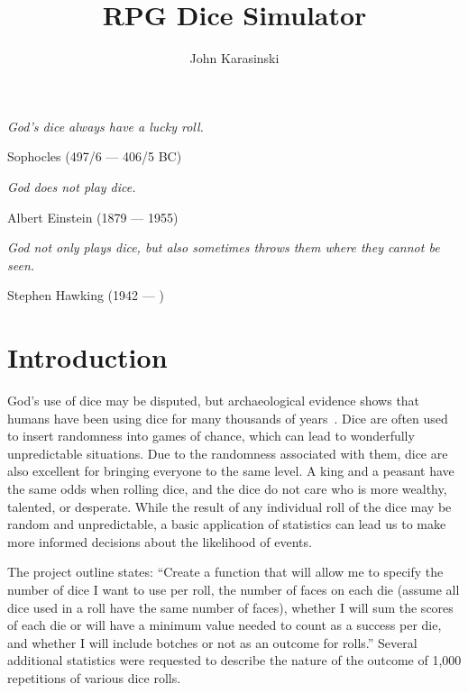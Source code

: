 \documentclass{article}
\begin{document}
\title{RPG Dice Simulator}
\author{John Karasinski}
\date{}

\setlength{\droptitle}{-6em}   %
\maketitle

\thispagestyle{plain}
\pagestyle{plain}

\vspace{-1.5cm}
\epigraph{\small\itshape God's dice always have a lucky roll.}{Sophocles (497/6 --- 406/5 BC)}%
\vspace{-2em}
\epigraph{\small\itshape God does not play dice.}{Albert Einstein (1879 --- 1955)}%
\vspace{-2em}
\epigraph{\small\itshape God not only plays dice, but also sometimes throws them where they cannot be seen.}{Stephen Hawking (1942 --- \hspace{1.5em})}%

\vspace{-1.0cm}
\section{Introduction}
God's use of dice may be disputed, but archaeological evidence shows that humans have been using dice for many thousands of years~\cite{history}. Dice are often used to insert randomness into games of chance, which can lead to wonderfully unpredictable situations. Due to the randomness associated with them, dice are also excellent for bringing everyone to the same level. A king and a peasant have the same odds when rolling dice, and the dice do not care who is more wealthy, talented, or desperate. While the result of any individual roll of the dice may be random and unpredictable, a basic application of statistics can lead us to make more informed decisions about the likelihood of events.

The project outline states: ``Create a function that will allow me to specify the number of dice I want to use per roll, the number of faces on each die (assume all dice used in a roll have the same number of faces), whether I will sum the scores of each die or will have a minimum value needed to count as a success per die, and whether I will include botches or not as an outcome for rolls.'' Several additional statistics were requested to describe the nature of the outcome of 1,000 repetitions of various dice rolls.
\end{document}
